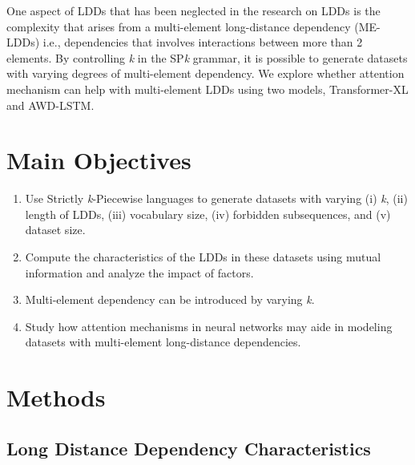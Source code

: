 \documentclass[a0,portrait]{a0poster}
\begin{document}
\begin{multicols}{2}
One aspect of LDDs that has been neglected in the research on LDDs is the complexity that arises from a multi-element long-distance dependency (ME-LDDs) i.e., dependencies that involves interactions between more than 2 elements. By controlling \emph{k} in the SP\emph{k} grammar, it is possible to generate datasets with varying degrees of multi-element dependency. We explore whether attention mechanism can help with multi-element LDDs using two models, Transformer-XL and AWD-LSTM.


\color{tudLogoColor}

\section*{Main Objectives}

\color{black}
\begin{enumerate}
\item Use Strictly \emph{k}-Piecewise languages to generate datasets with varying (i) \emph{k}, (ii) length of LDDs, (iii) vocabulary size, (iv) forbidden subsequences, and (v) dataset size.
\item Compute the characteristics of the LDDs in these datasets using mutual information and analyze the impact of factors.
\item Multi-element dependency can be introduced by varying \emph{k}. 
\item Study how attention mechanisms in neural networks may aide in modeling datasets with multi-element long-distance dependencies.
\end{enumerate}


\color{tudLogoColor}

\section*{Methods}

\subsection*{Long Distance Dependency Characteristics}


\end{multicols}
\end{document}
